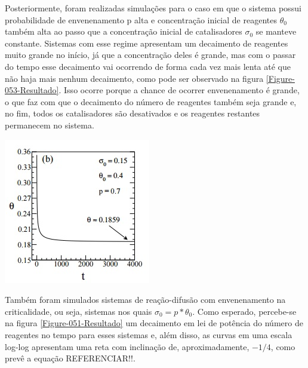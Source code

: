 Posteriormente, foram realizadas simulações para o caso em que o sistema possui
probabilidade de envenenamento p alta e concentração inicial de reagentes
$\theta_0$ também alta ao passo que a concentração inicial de catalisadores
$\sigma_0$ se manteve constante. Sistemas com esse regime apresentam um
decaimento de reagentes muito grande no início, já que a concentração deles
é grande, mas com o passar do tempo esse decaimento vai ocorrendo de forma
cada vez mais lenta até que não haja mais nenhum decaimento, como pode ser
observado na figura \ref{Figure-053-Resultado}. Isso ocorre porque a chance de
ocorrer envenenamento é grande, o que faz com que o decaimento do número de
reagentes também seja grande e, no fim, todos os catalisadores são desativados e
os reagentes restantes permanecem no sistema.

{ \centering
	\captionsetup{type=figure}
	\hfill \break
	\includegraphics[width=\columnwidth]{./figures/053-Resultado.jpg}
	\label{Figure-053-Resultado}
}

Também foram simulados sistemas de reação-difusão com envenenamento na
criticalidade, ou seja, sistemas nos quais $\sigma_0 = p*\theta_0$. Como
esperado, percebe-se na figura \ref{Figure-051-Resultado} um decaimento em lei
de potência do número de reagentes no tempo para esses sistemas e, além disso,
as curvas em uma escala log-log apresentam uma reta com inclinação de,
aproximadamente, $-1/4$, como prevê a equação REFERENCIAR!!.

